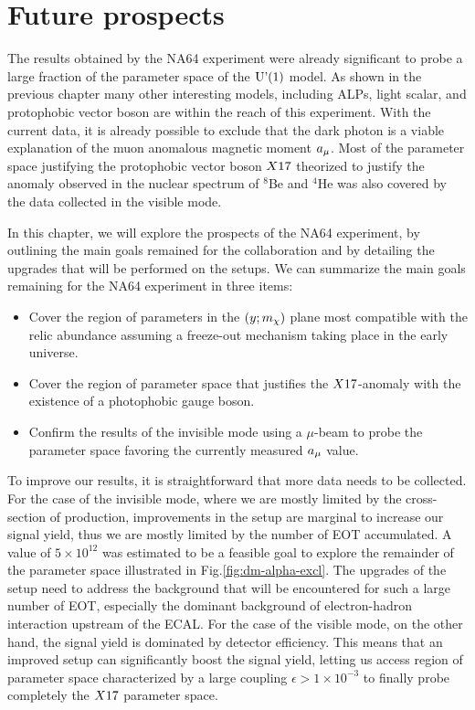 
\newcommand{\pdirfive}{chapters/plots/chapter5}

\chapter{Future prospects} %
\label{chapter5} %

The results obtained by the NA64 experiment were already significant to probe a large fraction of the parameter space of the $\textrm{U'(1)}$ model. As shown in the previous chapter many other interesting models, including ALPs, light scalar, and protophobic vector boson are within the reach of this experiment. With the current data, it is already possible to exclude that the dark photon is a viable explanation of the muon anomalous magnetic moment $a_{\mu}$. Most of the parameter space justifying the protophobic vector boson $X17$ theorized to justify the anomaly observed in the nuclear spectrum of $^8$Be and $^4$He was also covered by the data collected in the visible mode.

In this chapter, we will explore the prospects of the NA64 experiment, by outlining the main goals remained for the collaboration and by detailing the upgrades that will be performed on the setups. We can summarize the main goals remaining for the NA64 experiment in three items:

\begin{itemize}
\item Cover the region of parameters in the $(y;m_{\chi})$ plane most compatible with the relic abundance assuming a freeze-out mechanism taking place in the early universe.
\item Cover the region of parameter space that justifies the $X17$-anomaly with the existence of a photophobic gauge boson.  
\item Confirm the results of the invisible mode using a $\mu$-beam to probe the parameter space favoring the currently measured $a_{\mu}$ value.
\end{itemize}

To improve our results, it is straightforward that more data needs to be collected. For the case of the invisible mode, where we are mostly limited by the cross-section of production, improvements in the setup are marginal to increase our signal yield, thus we are mostly limited by the number of EOT accumulated. A value of $5 \times 10^{12}$ was estimated to be a feasible goal to explore the remainder of the parameter space illustrated in Fig.\ref{fig:dm-alpha-excl}. The upgrades of the setup need to address the background that will be encountered for such a large number of EOT, especially the dominant background of electron-hadron interaction upstream of the ECAL.
For the case of the visible mode, on the other hand, the signal yield is dominated by detector efficiency. This means that an improved setup can significantly boost the signal yield, letting us access region of parameter space characterized by a large coupling $\epsilon > 1 \times 10^{-3}$ to finally probe completely the $X17$ parameter space.

